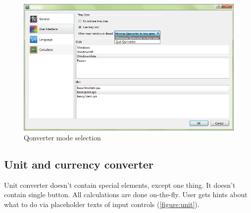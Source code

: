 \begin{figure}[ht]
\begin{center}
\includegraphics[width=13cm]{graphics/real-world/02-settings-gui.png}
\caption{Qonverter mode selection}\label{figure:settingsgui}
\end{center}
\end{figure}

\subsection{Unit and currency converter}
Unit converter doesn't contain special elements, except one thing. It doesn't contain single button. All calculations are done on-the-fly. User gets hints about what to do via placeholder texts of input controls (\autoref{figure:unit}).

